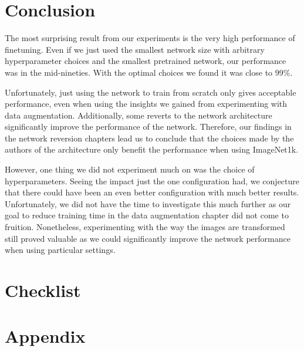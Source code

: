 \documentclass{article}
\begin{document}
\section{Conclusion}\label{sec:conclusion}
The most surprising result from our experiments is the very high performance of finetuning.
Even if we just used the smallest network size with arbitrary hyperparameter choices and the smallest pretrained network, our performance was in the mid-nineties.
With the optimal choices we found it was close to 99\%.

Unfortunately, just using the network to train from scratch only gives acceptable performance, even when using the insights we gained from experimenting with data augmentation.
Additionally, some reverts to the network architecture significantly improve the performance of the network.
Therefore, our findings in the network reversion chapters lead us to conclude that the choices made by the authors of the architecture only benefit the performance when using ImageNet1k.

However, one thing we did not experiment much on was the choice of hyperparameters.
Seeing the impact just the one configuration had, we conjecture that there could have been an even better configuration with much better results.
Unfortunately, we did not have the time to investigate this much further as our goal to reduce training time in the data augmentation chapter did not come to fruition.
Nonetheless, experimenting with the way the images are transformed still proved valuable as we could significantly improve the network performance when using particular settings.
\printbibliography
\section*{Checklist}

\appendix
\section{Appendix}\label{sec:appendix}
\end{document}
